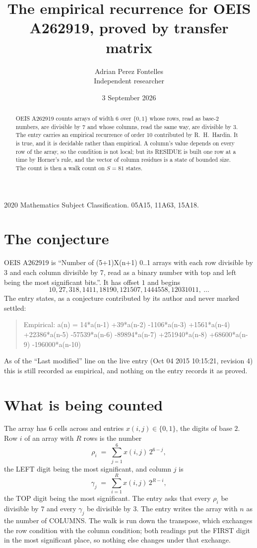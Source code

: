 \documentclass[11pt,a4paper]{article}
\title{The empirical recurrence for OEIS A262919, proved by transfer matrix}
\author{Adrian Perez Fontelles\\ \small Independent researcher}
\date{3 September 2026}
\theoremstyle{plain}
\theoremstyle{definition}
\begin{document}
\maketitle

\begin{abstract}
OEIS A262919 counts arrays of width $6$ over $\{0,1\}$ whose rows, read as base-$2$
numbers, are divisible by $7$ and whose columns, read the same way, are divisible by
$3$. The entry carries an empirical recurrence of order $10$ contributed by
R.~H.~Hardin. It is true, and it is decidable rather than empirical. A column's value depends on
every row of the array, so the condition is not local; but its RESIDUE is built one row at a
time by Horner's rule, and the vector of column residues is a state of bounded size. The count
is then a walk count on $S=81$ states.
\end{abstract}

\noindent\small 2020 Mathematics Subject Classification. 05A15, 11A63, 15A18.\normalsize

\section{The conjecture}

OEIS A262919 is ``Number of (5+1)X(n+1) 0..1 arrays with each row divisible by 3 and each column divisible by 7, read as a binary number with top and left being the most significant bits.''. It has offset $1$ and begins
\[
10, 27, 318, 1411, 18190, 121507, 1444558, 12031011,\ \dots
\]
The entry states, as a conjecture contributed by its author and never marked settled:
\begin{quote}
Empirical: a(n) = 14*a(n-1) +39*a(n-2) -1106*a(n-3) +1561*a(n-4) +22386*a(n-5) -57539*a(n-6) -89894*a(n-7) +251940*a(n-8) +68600*a(n-9) -196000*a(n-10)
\end{quote}
As of the ``Last modified'' line on the live entry (Oct 04 2015 10:15:21, revision 4) this is still
recorded as empirical, and nothing on the entry records it as proved.

\section{What is being counted}

The array has $6$ cells across and entries $x(i,j)\in\{0,1\}$, the digits of
base $2$. Row $i$ of an array with $R$ rows is the number
\[
\rho_i\;=\;\sum_{j=1}^{6}x(i,j)\,2^{6-j} ,
\]
the LEFT digit being the most significant, and column $j$ is
\[
\gamma_j\;=\;\sum_{i=1}^{R}x(i,j)\,2^{R-i} ,
\]
the TOP digit being the most significant. The entry asks that every $\rho_i$ be divisible by
$7$ and every $\gamma_j$ be divisible by $3$. The entry writes the array with $n$ as the number of COLUMNS. The walk is run down the transpose, which exchanges the row condition with the column condition; both readings put the FIRST digit in the most significant place, so nothing else changes under that exchange.
\end{document}
